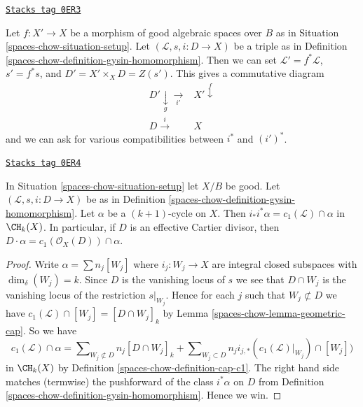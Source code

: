 \begin{remark}
\label{spaces-chow-remark-pullback-pairs}
\href{https://stacks.math.columbia.edu/tag/0ER3}{\texttt{Stacks tag 0ER3}}

Let $f : X' \to X$ be a morphism of good algebraic spaces over $B$
as in Situation \ref{spaces-chow-situation-setup}. Let $(\mathcal{L}, s, i : D \to X)$
be a triple as in Definition \ref{spaces-chow-definition-gysin-homomorphism}.
Then we can set $\mathcal{L}' = f^*\mathcal{L}$, $s' = f^*s$, and
$D' = X' \times_X D = Z(s')$. This gives a commutative diagram
$$
\begin{array}{cc}D' \underset{g}{\downarrow}\underset{i'}{\longrightarrow} & X' \overset{f}{\downarrow} \\ D \overset{i}{\longrightarrow} & X\end{array}
$$
and we can ask for various compatibilities between $i^*$ and $(i')^*$.
\end{remark}

\begin{lemma}
\label{spaces-chow-lemma-support-cap-effective-Cartier}
\href{https://stacks.math.columbia.edu/tag/0ER4}{\texttt{Stacks tag 0ER4}}

In Situation \ref{spaces-chow-situation-setup} let $X/B$ be good. Let
$(\mathcal{L}, s, i : D \to X)$ be as in
Definition \ref{spaces-chow-definition-gysin-homomorphism}. Let $\alpha$ be a
$(k + 1)$-cycle on $X$. Then $i_*i^*\alpha = c_1(\mathcal{L}) \cap \alpha$
in $\CH_k(X)$. In particular, if $D$ is an effective Cartier divisor, then
$D \cdot \alpha = c_1(\mathcal{O}_X(D)) \cap \alpha$.
\end{lemma}

\begin{proof}
Write $\alpha = \sum n_j[W_j]$ where $i_j : W_j \to X$ are integral closed
subspaces with $\dim_\delta(W_j) = k$.
Since $D$ is the vanishing locus of $s$ we see that
$D \cap W_j$ is the vanishing locus
of the restriction $s|_{W_j}$. Hence for each $j$ such that
$W_j \not \subset D$ we have
$c_1(\mathcal{L}) \cap [W_j] = [D \cap W_j]_k$
by Lemma \ref{spaces-chow-lemma-geometric-cap}. So we have
$$
c_1(\mathcal{L}) \cap \alpha
=
\sum\nolimits_{W_j \not \subset D} n_j[D \cap W_j]_k
+
\sum\nolimits_{W_j \subset D}
n_j i_{j, *}(c_1(\mathcal{L})|_{W_j}) \cap [W_j])
$$
in $\CH_k(X)$ by Definition \ref{spaces-chow-definition-cap-c1}.
The right hand side matches (termwise) the pushforward of the class
$i^*\alpha$ on $D$ from Definition \ref{spaces-chow-definition-gysin-homomorphism}.
Hence we win.
\end{proof}

